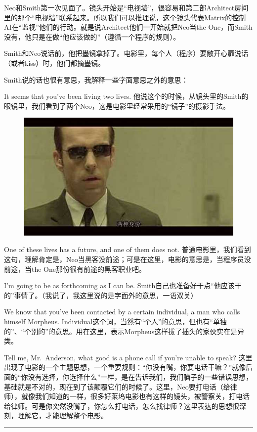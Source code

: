 \documentclass{ctexart}
\newcommand{\myparsep}{\noindent \rule[0.5ex]{\linewidth}{1pt}}
\begin{document}
Neo和Smith第一次见面了。镜头开始是“电视墙”，很容易和第二部Architect房间里的那个“电视墙”联系起来。所以我们可以推理说，这个镜头代表Matrix的控制AI在“监视”他们的行动。就是说Architect他们一开始就把Neo当the One，而Smith没有，他只是在做“他应该做的”（遵循一个程序的规则）。

Smith和Neo说话前，他把墨镜拿掉了。电影里，每个人（程序）要敞开心扉说话（或者kiss）时，他们都摘墨镜。

Smith说的话也很有意思，我解释一些字面意思之外的意思：

It seems that you've been living two lives. 他说这个的时候，从镜头里的Smith的眼镜里，我们看到了两个Neo，这是电影里经常采用的“镜子”的摄影手法。

\begin{figure}[htb]
\centering
\includegraphics[width=0.5\linewidth]{fig/read_Matrix-16}
\end{figure}

One of these lives has a future, and one of them does not. 普通电影里，我们看到这句，理解肯定是，Neo当黑客没前途；可是在这里，电影的意思是，当程序员没前途，当the One那份很有前途的黑客职业吧。

I'm going to be as forthcoming as I can be. Smith自己也准备好干点“他应该干的”事情了。（我说了，我这里说的是字面外的意思，一语双关）

We know that you've been contacted by a certain individual, a man who calls himself Morpheus. Individual这个词，当然有“个人”的意思，但也有“单独的”、“个别的”的意思。用在这里，表示Morpheus这样拔了插头的家伙实在是异类。

Tell me, Mr.~Anderson, what good is a phone call if you're unable to speak? 这里出现了电影的一个主题思想，一个重要规则：“你没有嘴，你要电话干嘛？”就像后面的“你没有选择，你选择什么”一样，是在告诉我们，我们脑子的一些错误思想，基础就是不对的，现在到了该颠覆它们的时候了。这里，Neo要打电话（给律师），就像我们知道的一样，很多好莱坞电影也有这样的镜头，被警察关，打电话给律师。可是你突然没嘴了，你怎么打电话，怎么找律师？这里表达的思想很深刻，理解它，才能理解整个电影。

\myparsep
\end{document}
